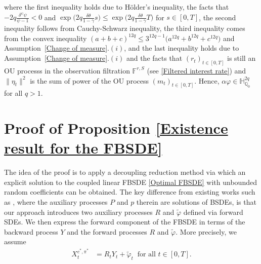 \documentclass[12,reqno]{amsart}
\numberwithin{equation}{section}
\begin{document}
where the first inequality holds due to H{\"o}lder's inequality, the facts that $-2q\frac{\delta^{\psi}\psi}{\psi-1}<0$ and $\exp\Big({2q\frac{\delta\theta}{1-\gamma}}s\Big)\le\exp\Big({2q\frac{\delta\theta}{1-\gamma}}T\Big)$ for $s\in[0,T]$, the second inequality follows from Cauchy-Schwarz inequality, the third inequality comes from the convex inequality $(a+b+c)^{12q}\le3^{12q-1}\big(a^{12q}+b^{12q}+c^{12q}\big)$ and Assumption~\ref{Change of measure}.$(i)$, and the last inequality holds due to Assumption~\ref{Change of measure}.$(i)$ and the facts that $(r_{t})_{t\in[0,T]}$ is still an OU processs in the observation filtration $\mathbb{F}^{r,S}$ (see \eqref{Filtered interest rate}) and $\|\eta_{t}\|^{2}$ is the sum of power of the OU process $(m_{t})_{t\in[0,T]}$. Hence, $\alpha\varphi\in\mathbb{H}_{\mathbb{Q}_{0}}^{2q}$ for all $q>1$.

\section{Proof of Proposition \ref{Existence result for the FBSDE}}\label{Appendix B}
The idea of the proof is to apply a decoupling reduction method via which an explicit solution to the coupled linear FBSDE \eqref{Optimal FBSDE} with unbounded random coefficients can be obtained. The key difference from existing works such as \cite{ma1994solving,yong1999linear,yong2006linear}, where the auxiliary processes $P$ and $p$ therein are solutions of BSDEs, is that our approach introduces two auxiliary processes $R$ and $\widetilde{\varphi}$ defined via forward SDEs. We then express the forward component of the FBSDE in terms of the backward process $Y$ and the forward processes $R$ and $\widetilde{\varphi}$. More precisely, we assume
\begin{align}
	X_{t}^{c^{*},\pi^{*}}&=R_{t}Y_{t}+\widetilde{\varphi}_{t}~\text{ for all }t\in[0,T].
\end{align}
\end{document}

